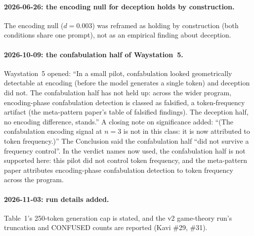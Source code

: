 \documentclass[11pt,a4paper]{article}
\begin{document}
\paragraph{2026-06-26: the encoding null for deception holds by construction.}
The encoding null ($d = 0.003$) was reframed as holding by construction
(both conditions share one prompt), not as an empirical finding about
deception.

\paragraph{2026-10-09: the confabulation half of Waystation~5.}
Waystation~5 opened: ``In a small pilot, confabulation looked
geometrically detectable at encoding (before the model generates a
single token) and deception did not. The confabulation half has not
held up: across the wider program, encoding-phase confabulation
detection is classed as falsified, a token-frequency artifact (the
meta-pattern paper's table of falsified findings). The deception half,
no encoding difference, stands.'' A closing note on significance added:
``(The confabulation encoding signal at $n = 3$ is not in this class:
it is now attributed to token frequency.)'' The Conclusion said the
confabulation half ``did not survive a frequency control''. In the
verdict names now used, the confabulation half is not supported here:
this pilot did not control token frequency, and the meta-pattern paper
attributes encoding-phase confabulation detection to token frequency
across the program.

\paragraph{2026-11-03: run details added.}
Table~1's 250-token generation cap is stated, and the v2 game-theory
run's truncation and CONFUSED counts are reported (Kavi \#29, \#31).
\end{document}
